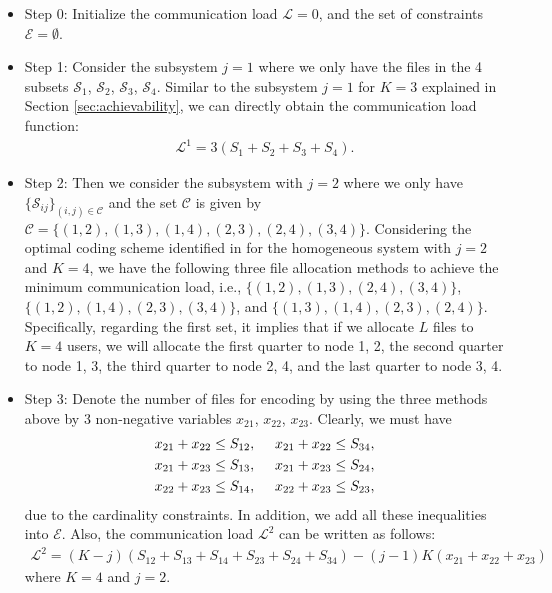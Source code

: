 \documentclass[conference]{IEEEtran}
\begin{document}
\begin{itemize}
\item{Step 0:} Initialize the communication load $\mathcal{L}=0$, and the set of constraints $\mathcal{E}=\emptyset$.

\item{Step 1:} Consider the subsystem $j=1$ where we only have the files in the 4 subsets $\mathcal{S}_1$, $\mathcal{S}_2$, $\mathcal{S}_3$, $\mathcal{S}_4$. Similar to the subsystem $j=1$ for $K=3$ explained in Section \ref{sec:achievability}, we can directly obtain the communication load function:
    \begin{eqnarray}
    \mathcal{L}^1=3(S_1+S_2+S_3+S_4).
    \end{eqnarray}

\item{Step 2:} Then we consider the subsystem with $j=2$ where we only have $\{\mathcal{S}_{ij}\}_{(i,j)\in\mathcal{C}}$ and the set $\mathcal{C}$ is given by $\mathcal{C}=\{(1,2),(1,3),(1,4),(2,3),(2,4),(3,4)\}$. Considering the optimal coding scheme identified in \cite{Avestimehr_CDC} for the homogeneous system with $j=2$ and $K=4$, we have the following three file allocation methods to achieve the minimum communication load, i.e., $\{(1,2),(1,3),(2,4),(3,4)\}$, $\{(1,2),(1,4),(2,3),(3,4)\}$, and $\{(1,3),(1,4),(2,3),(2,4)\}$. Specifically, regarding the first set, it implies that if we allocate $L$ files to $K=4$ users, we will allocate the first quarter to node 1, 2, the second quarter to node 1, 3, the third quarter to node 2, 4, and the last quarter to node 3, 4.

\item{Step 3:} Denote the number of files for encoding by using the three methods above by 3 non-negative variables $x_{21}$, $x_{22}$, $x_{23}$. Clearly, we must have
    \begin{eqnarray}
    x_{21}+x_{22}\leq S_{12},~~~~x_{21}+x_{22}\leq S_{34},\notag\\
    x_{21}+x_{23}\leq S_{13},~~~~x_{21}+x_{23}\leq S_{24},\\
    x_{22}+x_{23}\leq S_{14},~~~~x_{22}+x_{23}\leq S_{23},\notag
    \end{eqnarray}
    due to the cardinality constraints. In addition, we add all these inequalities into $\mathcal{E}$. Also, the communication load $\mathcal{L}^2$ can be written as follows:
\begin{eqnarray}
\mathcal{L}^2=(K-j)(S_{12}+S_{13}+S_{14}+S_{23}+S_{24}+S_{34})-(j-1)K(x_{21}+x_{22}+x_{23})
\end{eqnarray}
where $K=4$ and $j=2$.


\end{itemize}
\end{document}
